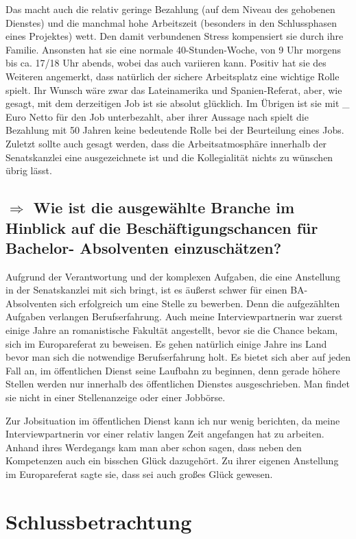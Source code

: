 \documentclass{../../sem_paper}
\newcommand\quest[1]{\subsection*{$\Rightarrow$ #1}}
\begin{document}
Das macht auch die relativ geringe Bezahlung (auf dem Niveau des gehobenen Dienstes) und die manchmal hohe Arbeitszeit (besonders in den Schlussphasen eines Projektes)  wett. Den damit verbundenen Stress kompensiert sie durch ihre Familie. Ansonsten hat sie eine  normale 40-Stunden-Woche, von 9 Uhr morgens bis ca. 17/18 Uhr abends, wobei das auch variieren kann.
Positiv hat sie des Weiteren angemerkt, dass natürlich der sichere Arbeitsplatz eine wichtige Rolle spielt.
Ihr Wunsch wäre zwar das Lateinamerika und Spanien-Referat, aber, wie gesagt, mit dem derzeitigen Job ist sie absolut glücklich. 
Im Übrigen ist sie mit \_ Euro Netto für den Job unterbezahlt, aber ihrer Aussage nach spielt die Bezahlung mit 50 Jahren keine bedeutende Rolle bei der Beurteilung eines Jobs.
Zuletzt sollte auch gesagt werden, dass die Arbeitsatmosphäre innerhalb der Senatskanzlei eine ausgezeichnete ist und die Kollegialität nichts zu wünschen übrig lässt.

\quest{Wie ist die ausgewählte Branche im Hinblick auf die Beschäftigungschancen für Bachelor- Absolventen einzuschätzen?}
Aufgrund der Verantwortung und der komplexen Aufgaben, die eine Anstellung in der Senatskanzlei mit sich bringt, ist es äußerst schwer für einen BA- Absolventen sich erfolgreich um eine Stelle zu bewerben.
Denn die aufgezählten Aufgaben verlangen Berufserfahrung. Auch meine Interviewpartnerin war zuerst einige Jahre an romanistische Fakultät angestellt, bevor sie die Chance bekam, sich im Europareferat zu beweisen. Es gehen natürlich einige Jahre ins Land  bevor man sich die notwendige Berufserfahrung holt. Es bietet sich aber auf jeden Fall an, im öffentlichen Dienst seine Laufbahn zu beginnen, denn gerade höhere Stellen werden nur innerhalb des öffentlichen Dienstes ausgeschrieben. Man findet sie nicht in einer Stellenanzeige oder einer Jobbörse.

Zur Jobsituation im öffentlichen Dienst kann ich nur wenig berichten, da meine Interviewpartnerin vor einer relativ langen Zeit angefangen hat zu arbeiten. Anhand ihres Werdegangs kam man aber schon sagen, dass neben den Kompetenzen auch ein bisschen Glück dazugehört. Zu ihrer eigenen Anstellung im Europareferat sagte sie, dass sei auch großes Glück gewesen.  


\section{Schlussbetrachtung}
\end{document}

